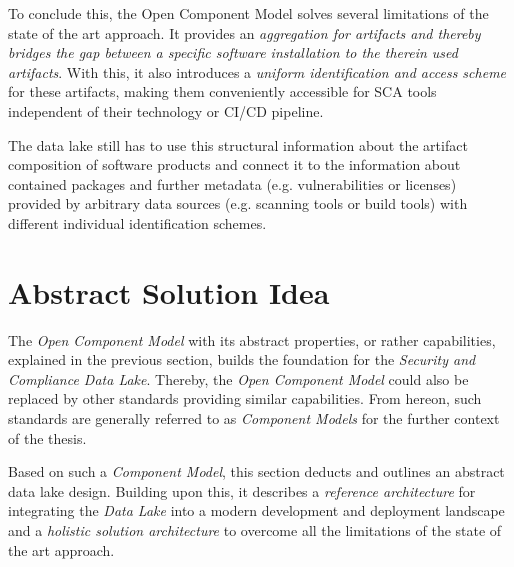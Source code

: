 To conclude this, the Open Component Model solves several limitations of the state of the art approach. It provides an \emph{aggregation for artifacts and thereby bridges the gap between a specific software installation to the therein used artifacts}. With this, it also introduces a \emph{uniform identification and access scheme} for these artifacts, making them conveniently accessible for SCA tools independent of their technology or CI/CD pipeline.\par
The data lake still has to use this structural information about the artifact composition of software products and connect it to the information about contained packages and further metadata (e.g. vulnerabilities or licenses) provided by arbitrary data sources (e.g. scanning tools or build tools) with different individual identification schemes. 

\section{Abstract Solution Idea}
The \emph{Open Component Model} with its abstract properties, or rather capabilities, explained in the previous section, builds the foundation for the \emph{Security and Compliance Data Lake}. Thereby, the \emph{Open Component Model} could also be replaced by other standards providing similar capabilities. From hereon, such standards are generally referred to as \emph{Component Models} for the further context of the thesis.\par
Based on such a \emph{Component Model}, this section deducts and outlines an abstract data lake design. Building upon this, it describes a \emph{reference architecture} for integrating the \emph{Data Lake} into a modern development and deployment landscape and a \emph{holistic solution architecture} to overcome all the limitations of the state of the art approach.

